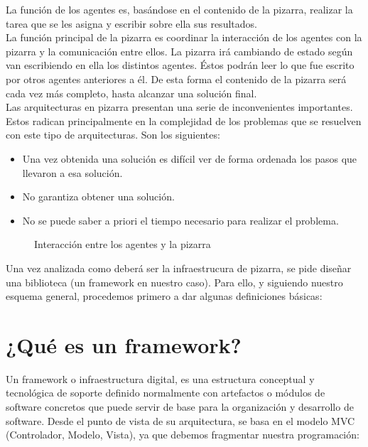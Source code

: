 La función de los agentes es, basándose en el contenido de la pizarra, realizar la tarea que se les asigna y escribir sobre ella sus resultados.\\

La función principal de la pizarra es coordinar la interacción de los agentes con la pizarra y la comunicación entre ellos. La pizarra irá cambiando de estado según van escribiendo en ella los distintos agentes. Éstos podrán leer lo que fue escrito por otros agentes anteriores a él. De esta forma el contenido de la pizarra será cada vez más completo, hasta alcanzar una solución final.\\

Las arquitecturas en pizarra presentan una serie de inconvenientes importantes. Estos radican principalmente en la complejidad de los problemas que se resuelven con este tipo de arquitecturas. Son los siguientes:

\begin{itemize}
	\item Una vez obtenida una solución es difícil ver de forma ordenada los pasos que llevaron a esa solución.
	\item No garantiza obtener una solución.
	\item No se puede saber a priori el tiempo necesario para realizar el problema.
\end{itemize}

\begin{figure}[!h]
\centering
\pizarra
\caption{Interacción entre los agentes y la pizarra}
\end{figure}

Una vez analizada como deberá ser la infraestrucura de pizarra, se pide diseñar una biblioteca (un framework en nuestro caso). Para ello, y siguiendo nuestro esquema general, procedemos primero a dar algunas definiciones básicas:\\

\section{¿Qué es un framework?}
Un framework o infraestructura digital, es una estructura conceptual y tecnológica de soporte definido normalmente con artefactos o módulos de software concretos que puede servir de base para la organización y desarrollo de software.
Desde el punto de vista de su arquitectura, se basa en el modelo MVC (Controlador, Modelo, Vista), ya que debemos fragmentar nuestra programación:


